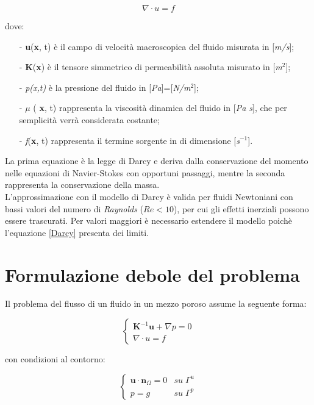 \begin{equation}
\nabla \cdot u =f
\end{equation}

dove:
\begin{enumerate}
\item[-] \textbf{u}(\textbf{x}, t) è il campo di velocità macroscopica del fluido misurata in [\textit{m/s}];
\item[-] \textbf{K}(\textbf{x}) è il tensore simmetrico di permeabilità assoluta misurato in [\textit{m$^2$}];
\item[-] \textit{p(x,t)} è la pressione del fluido in [\textit{Pa}]=[\textit{N/m$^2$}];
\item[-] \textit{$\mu$ } ( \textbf{x}, t) rappresenta la viscosità dinamica del fluido in [\textit{Pa s}], che per semplicità verrà considerata costante;
\item[-] \textit{f}(\textbf{x}, t) rappresenta il termine sorgente in di dimensione [\textit{s}$^{-1}$].
\end{enumerate}


La prima equazione è la legge di Darcy e deriva dalla conservazione del momento nelle equazioni di Navier-Stokes con opportuni passaggi, mentre la seconda rappresenta la conservazione della massa. \\
L'approssimazione con il modello di Darcy è valida per fluidi Newtoniani con bassi valori del numero di \textit{Raynolds} ($Re<10$), per cui gli effetti inerziali possono essere trascurati. Per valori maggiori è necessario estendere il modello poichè l'equazione \ref{Darcy} presenta dei limiti.


 \section{Formulazione debole del problema}
Il problema del flusso di un fluido in un mezzo poroso assume la seguente forma:

\begin{equation}
\begin{cases}
\textbf{K}^{-1}  \textbf{u} +\nabla {p} =0 \\
\nabla  \cdot u =f
\end{cases} 
\end{equation}\label{sistema}

\noindent con condizioni al contorno:

\begin{equation}
\begin{cases}
\textbf{u} \cdot \textbf{n}_{\Omega} =0  & su \;  \Gamma ^u\\
p =g & su \; \Gamma ^p
\end{cases}
\end{equation}\label{bc}

